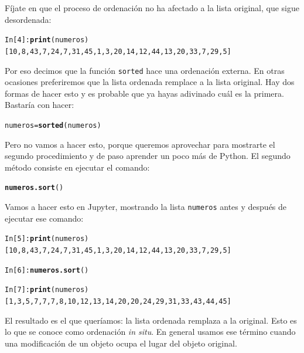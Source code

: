 \documentclass[10pt,a4paper]{article}\usepackage[]{graphicx}\usepackage[]{color}
\makeatletter
\newcommand{\hlstd}[1]{\textcolor[rgb]{0.345,0.345,0.345}{#1}}%
\newcommand{\hlkwb}[1]{\textcolor[rgb]{0.69,0.353,0.396}{#1}}%
\newcommand{\hlkwd}[1]{\textcolor[rgb]{0.737,0.353,0.396}{\textbf{#1}}}%
\newenvironment{kframe}{%
 \def\at@end@of@kframe{}%
 \ifinner\ifhmode%
  \def\at@end@of@kframe{\end{minipage}}%
  \begin{minipage}{\columnwidth}%
 \fi\fi%
 \def\FrameCommand##1{\hskip\@totalleftmargin \hskip-\fboxsep
 \colorbox{shadecolor}{##1}\hskip-\fboxsep
     \hskip-\linewidth \hskip-\@totalleftmargin \hskip\columnwidth}%
 \MakeFramed {\advance\hsize-\width
   \@totalleftmargin\z@ \linewidth\hsize
   \@setminipage}}%
 {\par\unskip\endMakeFramed%
 \at@end@of@kframe}
\newenvironment{knitrout}{}{} %
\makeatother
\begin{document}
Fíjate en que el proceso de ordenación no ha afectado a la lista original, que sigue desordenada:
\begin{knitrout}
\color{fgcolor}\begin{kframe}
\begin{alltt}
In [4]: \hlkwd{print}(numeros)
[10, 8, 43, 7, 24, 7, 31, 45, 1, 3, 20, 14, 12, 44, 13, 20, 33, 7, 29, 5]
\end{alltt}
\end{kframe}
\end{knitrout}
Por eso decimos que la función {\tt sorted} hace una ordenación {\sf externa}. En otras ocasiones preferiremos que la lista ordenada remplace a la lista original. Hay dos formas de hacer esto y es probable que ya hayas adivinado cuál es la primera. Bastaría con hacer:
\begin{knitrout}
\color{fgcolor}\begin{kframe}
\begin{alltt}
\hlstd{numeros} \hlkwb{=} \hlkwd{sorted}\hlstd{(numeros)}
\end{alltt}
\end{kframe}
\end{knitrout}
Pero no vamos a hacer esto, porque queremos aprovechar para mostrarte el segundo procedimiento y de paso aprender un poco más de Python. El segundo método consiste en ejecutar el comando:
\begin{knitrout}
\color{fgcolor}\begin{kframe}
\begin{alltt}
\hlkwd{numeros.sort}\hlstd{()}
\end{alltt}
\end{kframe}
\end{knitrout}
Vamos a hacer esto en Jupyter, mostrando la lista {\tt numeros} antes y después de ejecutar ese comando:
\begin{knitrout}
\color{fgcolor}\begin{kframe}
\begin{alltt}
In [5]: \hlkwd{print}(numeros)
[10, 8, 43, 7, 24, 7, 31, 45, 1, 3, 20, 14, 12, 44, 13, 20, 33, 7, 29, 5]

In [6]: \hlkwd{numeros.sort}()

In [7]: \hlkwd{print}(numeros)
[1, 3, 5, 7, 7, 7, 8, 10, 12, 13, 14, 20, 20, 24, 29, 31, 33, 43, 44, 45]
\end{alltt}
\end{kframe}
\end{knitrout}
El resultado es el que queríamos: la lista ordenada remplaza a la original. Esto es lo que se conoce como ordenación {\em in situ}. En general usamos ese término cuando una modificación de un objeto ocupa el lugar del objeto original.
\end{document}
